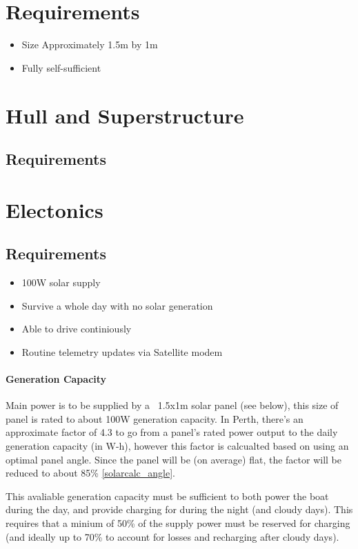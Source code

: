 


\section{Requirements}
\begin{itemize}
\item{Size} Approximately 1.5m by 1m
\item Fully self-sufficient
\end{itemize}

%
%
\section{Hull and Superstructure}
\subsection{Requirements}


%
%
\section{Electonics}

\subsection{Requirements}

\begin{itemize}
\item 100W solar supply
\item Survive a whole day with no solar generation
\item Able to drive continiously
\item Routine telemetry updates via Satellite modem
\end{itemize}

\paragraph{Generation Capacity}
Main power is to be supplied by a ~1.5x1m solar panel (see below), this size of panel is rated to about 100W generation capacity. In Perth, there's an approximate factor of 4.3 to go from a panel's rated power output to the daily generation capacity (in W-h), however this factor is calcualted based on using an optimal panel angle. Since the panel will be (on average) flat, the factor will be reduced to about 85\% \ref{solarcalc_angle}.

This avaliable generation capacity must be sufficient to both power the boat during the day, and provide charging for during the night (and cloudy days). This requires that a minium of 50\% of the supply power must be reserved for charging (and ideally up to 70\% to account for losses and recharging after cloudy days).

